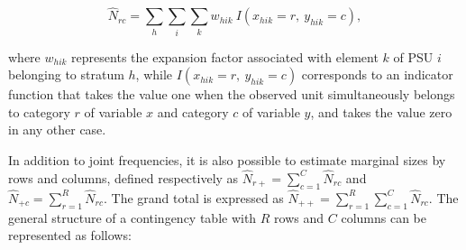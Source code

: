 \documentclass[
  english,
  12pt,
]{book}
\begin{document}
\[
\hat{N}_{rc} = \sum_{h} \sum_{i} \sum_{k} w_{hik} \ I(x_{hik}=r,\ y_{hik}=c),
\]

where \(w_{hik}\) represents the expansion factor associated with element \(k\) of PSU \(i\) belonging to stratum \(h\), while \(I(x_{hik}=r,\ y_{hik}=c)\) corresponds to an indicator function that takes the value one when the observed unit simultaneously belongs to category \(r\) of variable \(x\) and category \(c\) of variable \(y\), and takes the value zero in any other case.

In addition to joint frequencies, it is also possible to estimate marginal sizes by rows and columns, defined respectively as \(\hat{N}_{r+} = \sum_{c=1}^{C} \hat{N}_{rc}\) and \(\hat{N}_{+c} = \sum_{r=1}^{R} \hat{N}_{rc}\). The grand total is expressed as \(\hat{N}_{++} = \sum_{r=1}^{R}\sum_{c=1}^{C} \hat{N}_{rc}\). The general structure of a contingency table with \(R\) rows and \(C\) columns can be represented as follows:
\end{document}
